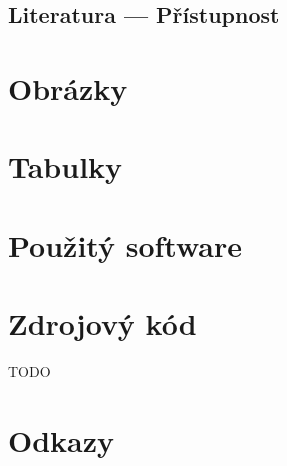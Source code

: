 \documentclass{ctuthesis}
\begin{document}
\appendix

\printbibliography[title={Seznam literatury}]

\section{Literatura --- Přístupnost}

\printbibliography[keyword={a11y},heading=none]

\chapter{Obrázky}



\chapter{Tabulky}



\chapter{Použitý software}



\chapter{Zdrojový kód}

TODO

\chapter{Odkazy}


\end{document}
